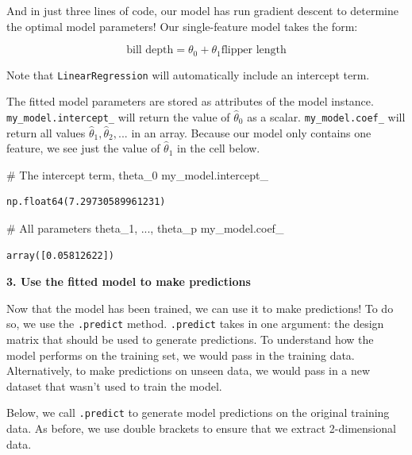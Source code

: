\documentclass[
  letterpaper,
  DIV=11,
  numbers=noendperiod]{scrreprt}
\newenvironment{Shaded}{\begin{snugshade}}{\end{snugshade}}
\newcommand{\CommentTok}[1]{\textcolor[rgb]{0.37,0.37,0.37}{#1}}
\newcommand{\NormalTok}[1]{\textcolor[rgb]{0.00,0.23,0.31}{#1}}
\begin{document}
And in just three lines of code, our model has run gradient descent to
determine the optimal model parameters! Our single-feature model takes
the form:

\[\text{bill depth} = \theta_0 + \theta_1 \text{flipper length}\]

Note that \texttt{LinearRegression} will automatically include an
intercept term.

The fitted model parameters are stored as attributes of the model
instance. \texttt{my\_model.intercept\_} will return the value of
\(\hat{\theta}_0\) as a scalar. \texttt{my\_model.coef\_} will return
all values \(\hat{\theta}_1,
\hat{\theta}_2, ...\) in an array. Because our model only contains one
feature, we see just the value of \(\hat{\theta}_1\) in the cell below.

\begin{Shaded}
\begin{Highlighting}[]
\CommentTok{\# The intercept term, theta\_0}
\NormalTok{my\_model.intercept\_}
\end{Highlighting}
\end{Shaded}

\begin{verbatim}
np.float64(7.29730589961231)
\end{verbatim}

\begin{Shaded}
\begin{Highlighting}[]
\CommentTok{\# All parameters theta\_1, ..., theta\_p}
\NormalTok{my\_model.coef\_}
\end{Highlighting}
\end{Shaded}

\begin{verbatim}
array([0.05812622])
\end{verbatim}

\textbf{3. Use the fitted model to make predictions}

Now that the model has been trained, we can use it to make predictions!
To do so, we use the \texttt{.predict} method. \texttt{.predict} takes
in one argument: the design matrix that should be used to generate
predictions. To understand how the model performs on the training set,
we would pass in the training data. Alternatively, to make predictions
on unseen data, we would pass in a new dataset that wasn't used to train
the model.

Below, we call \texttt{.predict} to generate model predictions on the
original training data. As before, we use double brackets to ensure that
we extract 2-dimensional data.
\end{document}
